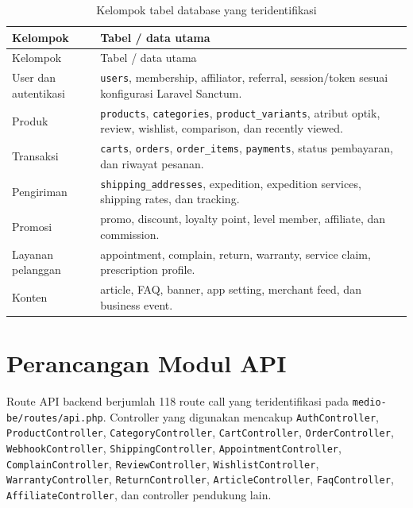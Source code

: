 \documentclass[12pt,a4paper]{report}
\begin{document}
\begin{longtable}{p{}p{}}
\caption{Kelompok tabel database yang teridentifikasi}\\
\toprule
Kelompok & Tabel / data utama \\
\midrule
\endfirsthead
\toprule
Kelompok & Tabel / data utama \\
\midrule
\endhead
User dan autentikasi & \texttt{users}, membership, affiliator, referral, session/token sesuai konfigurasi Laravel Sanctum. \\
Produk & \texttt{products}, \texttt{categories}, \texttt{product\_variants}, atribut optik, review, wishlist, comparison, dan recently viewed. \\
Transaksi & \texttt{carts}, \texttt{orders}, \texttt{order\_items}, \texttt{payments}, status pembayaran, dan riwayat pesanan. \\
Pengiriman & \texttt{shipping\_addresses}, expedition, expedition services, shipping rates, dan tracking. \\
Promosi & promo, discount, loyalty point, level member, affiliate, dan commission. \\
Layanan pelanggan & appointment, complain, return, warranty, service claim, prescription profile. \\
Konten & article, FAQ, banner, app setting, merchant feed, dan business event. \\
\bottomrule
\end{longtable}

\section{Perancangan Modul API}
Route API backend berjumlah 118 route call yang teridentifikasi pada \texttt{medio-be/routes/api.php}. Controller yang digunakan mencakup \texttt{AuthController}, \texttt{ProductController}, \texttt{CategoryController}, \texttt{CartController}, \texttt{OrderController}, \texttt{WebhookController}, \texttt{ShippingController}, \texttt{AppointmentController}, \texttt{ComplainController}, \texttt{ReviewController}, \texttt{WishlistController}, \texttt{WarrantyController}, \texttt{ReturnController}, \texttt{ArticleController}, \texttt{FaqController}, \texttt{AffiliateController}, dan controller pendukung lain.
\end{document}
